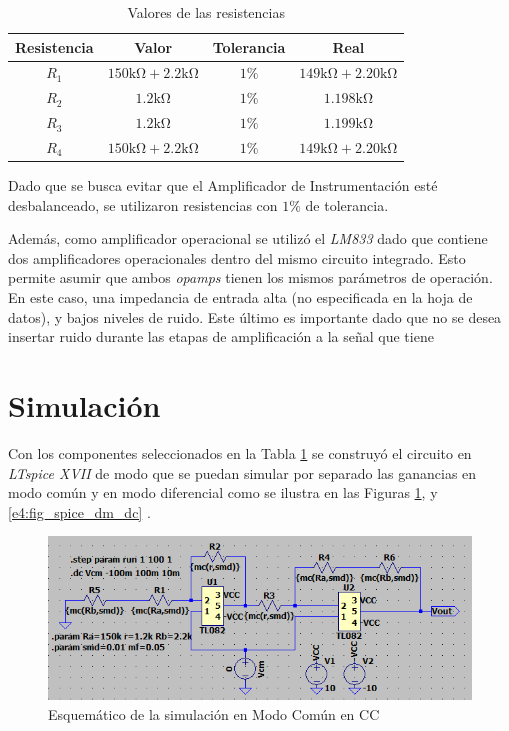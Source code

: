 \begin{table}[ht]
\begin{center}
\begin{tabular}{||c|c|c|c||}
\hline
Resistencia	&	Valor &	Tolerancia & Real\\
\hline	
$R_1$	&	$150\si{\kilo\ohm} + 2.2\si{\kilo\ohm}$	&	$1\%$	&	$149\si{\kilo\ohm} + 2.20\si{\kilo\ohm}$ \\
$R_2$	&	$1.2\si{\kilo\ohm}$	&	$1\%$	&	$1.198\si{\kilo\ohm}$ \\
$R_3$	&	$1.2\si{\kilo\ohm}$	&	$1\%$	&	$1.199\si{\kilo\ohm}$ \\
$R_4$	&	$150\si{\kilo\ohm} + 2.2\si{\kilo\ohm}$	&	$1\%$	&	$149\si{\kilo\ohm} + 2.20\si{\kilo\ohm}$ \\
\hline
\end{tabular}
\end{center}
\caption{Valores de las resistencias}
\label{e4:tab_res_vals}
\end{table}

Dado que se busca evitar que el Amplificador de Instrumentación esté desbalanceado, se utilizaron resistencias con $1\%$ de tolerancia.

Además, como amplificador operacional se utilizó el \textit{LM833} dado que contiene dos amplificadores operacionales dentro del mismo circuito integrado. Esto permite asumir que ambos \textit{opamps} tienen los mismos parámetros de operación. En este caso, una impedancia de entrada alta (no especificada en la hoja de datos), y bajos niveles de ruido. Este último es importante dado que no se desea insertar ruido durante las etapas de amplificación a la señal que tiene 

\newpage
\section{Simulación}

Con los componentes seleccionados en la Tabla \ref{e4:tab_res_vals} se construyó el circuito en \textit{LTspice XVII} de modo que se puedan simular por separado las ganancias en modo común y en modo diferencial como se ilustra en las Figuras
\ref{e4:fig_spice_cm_dc},
 y 
\ref{e4:fig_spice_dm_dc}
.
\begin{figure}[!ht]
\begin{center}
\includegraphics[width=\linewidth]{../Ex4/Informe/res/spice/spice_cm_dc_sch.png}
\caption{Esquemático de la simulación en Modo Común en CC}
\label{e4:fig_spice_cm_dc}
\end{center}
\end{figure}


